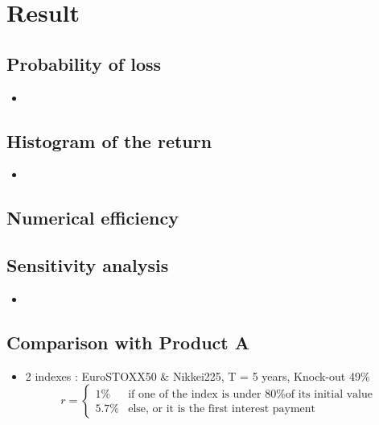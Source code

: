 \section{Result}


\subsection{Probability of loss}
\begin{frame}
\myframetitle{}
\begin{itemize}
	\item []
\end{itemize}
\end{frame}

\subsection{Histogram of the return}
\begin{frame}
\myframetitle{}
\begin{itemize}
	\item []
\end{itemize}
\end{frame}

\subsection{Numerical efficiency}
\begin{frame}
\myframetitle{}
\begin{figure}
	\centering
\end{figure}
\end{frame}

\subsection{Sensitivity analysis}
\begin{frame}
\myframetitle{}
\begin{itemize}
	\item []
\end{itemize}
\end{frame}

\subsection{Comparison with Product A}
\begin{frame}
\myframetitle{}
\begin{itemize}
	\item 2 indexes : EuroSTOXX50 \& Nikkei225, T = 5 years, Knock-out 49\% 
	$$
	r = 
	\left \{
	\begin{array}{ll}
    1\%   & \mbox{if one of the index is under 80\% of its initial value} \\
		5.7\% & \mbox{else, or it is the first interest payment}
  \end{array}
	\right.
	$$
\end{itemize}
\end{frame}